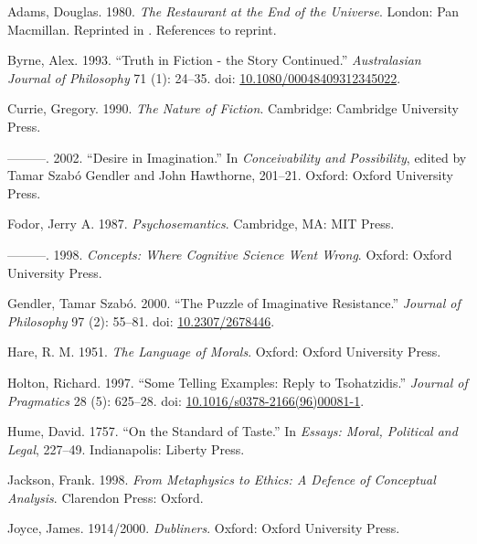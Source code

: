 \documentclass[
  10pt,
  letterpaper,
  DIV=11,
  numbers=noendperiod,
  twoside]{scrartcl}
\newlength{\cslhangindent}
\newenvironment{CSLReferences}[2] %
 {\begin{list}{}{%
  \setlength{\itemindent}{0pt}
  \setlength{\leftmargin}{0pt}
  \setlength{\parsep}{0pt}
  \ifodd #1
   \setlength{\leftmargin}{\cslhangindent}
   \setlength{\itemindent}{-1\cslhangindent}
  \fi
  \setlength{\itemsep}{#2\baselineskip}}}
 {\end{list}}
\begin{document}
\label{refs}
\begin{CSLReferences}{1}{0}
Adams, Douglas. 1980. \emph{The Restaurant at the End of the Universe}.
London: Pan Macmillan. Reprinted in \cite{Adams2002}. References to
reprint.

Byrne, Alex. 1993. {``Truth in Fiction - the Story Continued.''}
\emph{Australasian Journal of Philosophy} 71 (1): 24--35. doi:
\href{https://doi.org/10.1080/00048409312345022}{10.1080/00048409312345022}.

Currie, Gregory. 1990. \emph{The Nature of Fiction}. Cambridge:
Cambridge University Press.

---------. 2002. {``Desire in Imagination.''} In \emph{Conceivability
and Possibility}, edited by Tamar Szabó Gendler and John Hawthorne,
201--21. Oxford: Oxford University Press.

Fodor, Jerry A. 1987. \emph{Psychosemantics}. Cambridge, MA: MIT Press.

---------. 1998. \emph{Concepts: Where Cognitive Science Went Wrong}.
Oxford: Oxford University Press.

Gendler, Tamar Szabó. 2000. {``The Puzzle of Imaginative Resistance.''}
\emph{Journal of Philosophy} 97 (2): 55--81. doi:
\href{https://doi.org/10.2307/2678446}{10.2307/2678446}.

Hare, R. M. 1951. \emph{The Language of Morals}. Oxford: Oxford
University Press.

Holton, Richard. 1997. {``Some Telling Examples: Reply to
Tsohatzidis.''} \emph{Journal of Pragmatics} 28 (5): 625--28. doi:
\href{https://doi.org/10.1016/s0378-2166(96)00081-1}{10.1016/s0378-2166(96)00081-1}.

Hume, David. 1757. {``On the Standard of Taste.''} In \emph{Essays:
Moral, Political and Legal}, 227--49. Indianapolis: Liberty Press.

Jackson, Frank. 1998. \emph{From Metaphysics to Ethics: A Defence of
Conceptual Analysis}. Clarendon Press: Oxford.

Joyce, James. 1914/2000. \emph{Dubliners}. Oxford: Oxford University
Press.


\end{CSLReferences}
\end{document}
